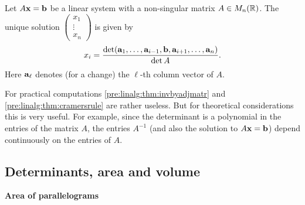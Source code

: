 \documentclass[10pt, a4paper]{article}
\begin{document}
\begin{theorem}\label{pre:linalg:thm:cramersrule}
    Let $A\mathbf{x} = \mathbf{b}$ be a linear system with a non-singular matrix $A \in M_n(\mathbb{R})$.
    The unique solution $\begin{pmatrix}
        x_1 \\ \vdots \\ x_n
    \end{pmatrix}$ is given by
    \[
    x_i = \frac{\det(\mathbf{a}_1, \dotsc, \mathbf{a}_{i - 1}, \mathbf{b}, \mathbf{a}_{i + 1}, \dotsc, \mathbf{a}_n)}{\det A}.
    \]
    Here $\mathbf{a}_\ell$ denotes (for a change) the $\ell$-th column vector of $A$.
\end{theorem}

\begin{remark}
    For practical computations \autoref{pre:linalg:thm:invbyadjmatr} and \autoref{pre:linalg:thm:cramersrule} are rather useless.
    But for theoretical considerations this is very useful.
    For example,
    since the determinant is a polynomial in the entries of the matrix $A$,
    the entries $A ^ {-1}$
    (and also the solution to $A\mathbf{x} = \mathbf{b}$)
    depend continuously on the entries of $A$.
\end{remark}

\subsection{Determinants, area and volume}

\textbf{Area of parallelograms}
\end{document}
